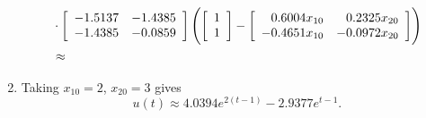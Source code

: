 \documentclass{article}
\begin{document}
\begin{enumerate}
{\begin{align*}
      & \cdot
      \left[\begin{array}{r r}
       -1.5137 & -1.4385 \\
       -1.4385 & -0.0859
      \end{array}\right]
      \left(
        \left[\begin{array}{c}
          1 \\ 1
        \end{array}\right]
      - \left[\begin{array}{r r}
          0.6004 x_{10} &  0.2325 x_{20} \\
         -0.4651 x_{10} & -0.0972 x_{20}
        \end{array}\right]
      \right) \\
      & \approx
    \end{align*}
  }
  \item{
    Taking $x_{10} = 2$, $x_{20} = 3$ gives 
    $$
    u(t) \approx 4.0394 e^{2(t - 1)} - 2.9377 e^{t - 1}.
    $$
  }
\end{enumerate}
\end{document}
